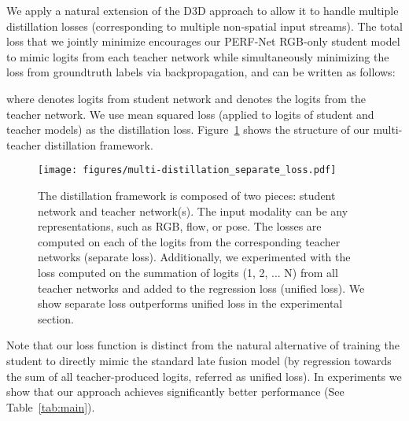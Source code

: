 \documentclass[letterpaper]{article} \usepackage{aaai21}  \usepackage{times}  \usepackage{helvet} \usepackage{courier}  \usepackage[hyphens]{url}  \usepackage{graphicx} \urlstyle{rm} \def\UrlFont{\rm}  \usepackage{natbib}  \usepackage{caption} \frenchspacing  \setlength{\pdfpagewidth}{8.5in}  \setlength{\pdfpageheight}{11in}
\begin{document}
We apply a natural extension of the D3D approach to allow it to handle multiple distillation
losses (corresponding to multiple non-spatial input streams). The total loss that we jointly minimize encourages our  PERF-Net RGB-only student model to
 mimic  logits from each teacher network while simultaneously 
 minimizing the loss from groundtruth labels via backpropagation, 
 and can be written as follows:
 
\vspace{-0.2cm}
{\footnotesize

}

\noindent where  denotes logits from student network and  denotes the logits from the  teacher network.  We use mean squared loss (applied to logits of student and teacher models) as the distillation loss. Figure~\ref{fig:distillation} shows the structure of our multi-teacher distillation framework. 

\begin{figure}[t!]
    \centering
    \footnotesize
    \texttt{[image: figures/multi-distillation\_separate\_loss.pdf]}
    \caption{\footnotesize The distillation framework is composed of two pieces: student network and teacher network(s). The input modality can be any representations, such as RGB, flow, or pose. The losses are computed on each of the logits from the corresponding teacher networks (separate loss). Additionally, we experimented with the loss computed on the summation of logits (1, 2, ... N) from all teacher networks and added to the regression loss (unified loss). We show separate loss outperforms unified loss in the experimental section.}
    \label{fig:distillation}
\vspace{-0.4cm}
\end{figure}

Note that our loss function is distinct from the natural alternative of training the student to directly mimic the standard late fusion model (by regression towards the sum of all teacher-produced logits, referred as unified loss).  In experiments we show that our approach achieves significantly better performance (See Table~\ref{tab:main}).
\end{document}
